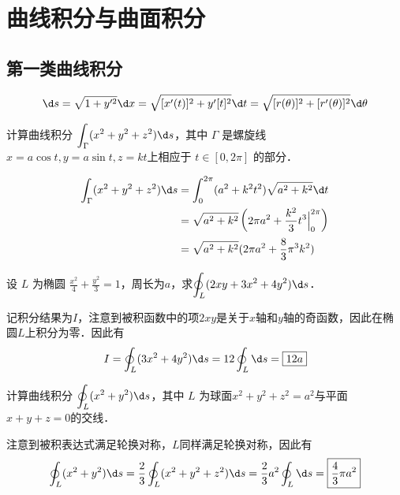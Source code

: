 \documentclass[12pt, a4paper, oneside, UTF8]{ctexbook}
\begin{document}
% 
\else
\fi
\chapter{曲线积分与曲面积分}
\section{第一类曲线积分}
\begin{theorem}[弧微分]
    \[\d s = \sqrt{1 + y'^2} \d x = \sqrt{[x'(t)]^2+y'[t]^2}\d t=\sqrt{[r(\theta)]^2+[r'(\theta)]^2}\d \theta\]
\end{theorem}
\begin{example}
    计算曲线积分 $\displaystyle\int_\Gamma (x^2+y^2+z^2) \d s$，其中 $\Gamma$ 是螺旋线 $x = a\cos t, y = a\sin t, z = kt$上相应于 $t \in [0,2\pi]$ 的部分．
\end{example}
\begin{solution}
    \begin{align*}
        \int_\Gamma (x^2+y^2+z^2) \d s &= \int_0^{2\pi} (a^2 + k^2t^2) \sqrt{a^2+k^2} \d t \\
        &= \sqrt{a^2+k^2} \left( 2\pi a^2 + \frac{k^2}{3}t^3\Big|_0^{2\pi} \right) \\
        &= \sqrt{a^2+k^2}(2\pi a^2 + \frac{8}{3}\pi^3 k^2)
    \end{align*}
\end{solution}
\begin{example}
    设 $L$ 为椭圆 $\frac{x^2}{4} + \frac{y^2}{3} = 1$，周长为$a$，求$\displaystyle\oint_L (2xy+3x^2+4y^2)\d s$．
\end{example}
\begin{solution}
    记积分结果为$I$，注意到被积函数中的项$2xy$是关于$x$轴和$y$轴的奇函数，因此在椭圆$L$上积分为零．因此有
    \[I = \oint_L (3x^2 + 4y^2) \d s = 12\oint_L \d s= \boxed{12a}\]
\end{solution}
\begin{example}
    计算曲线积分 $\displaystyle\oint_L(x^2+y^2)\d s$，其中 $L$ 为球面$x^2+y^2+z^2=a^2$与平面$x+y+z=0$的交线．
\end{example}
\begin{solution}
    注意到被积表达式满足轮换对称，$L$同样满足轮换对称，因此有
    \[\oint_L (x^2+y^2)\d s = \frac{2}{3}\oint_L (x^2+y^2+z^2) \d s = \frac{2}{3}a^2\oint_L \d s=\boxed{\frac{4}{3}\pi a^2}\]
\end{solution}
\end{document}
